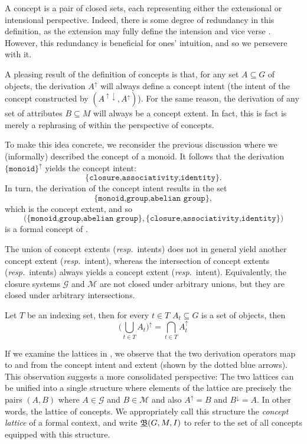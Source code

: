 A concept is a pair of closed sets, each representing either the extensional or intensional perspective. Indeed, there
is some degree of redundancy in this definition, as the extension may fully define the intension and vice verse \cite{ganter2016conceptual}.
However, this redundancy is beneficial for ones' intuition, and so we persevere with it.

A pleasing result of the definition of concepts is that, for any set $A \subseteq G$ of objects, the derivation $A^{\uparrow}$
will always define a concept intent (the intent of the concept constructed by $(A^{\uparrow \downarrow}, A^{\uparrow})$).
For the same reason, the derivation of any set of attributes $B \subseteq M$ will always be a concept extent. In fact, this
is fact is merely a rephrasing of  within the perspective of concepts.

To make this idea concrete, we reconsider the previous discussion where we (informally) described the concept of a
monoid. It follows that the derivation $\{\texttt{monoid}\}^{\uparrow}$ yields the concept intent:
\[
	\{\texttt{closure,associativity,identity}\}.
\]
%
In turn, the derivation of the concept intent results in the set
\[
	\{\texttt{monoid,group,abelian group}\},
\]which is the concept extent, and so
\[
	\big(\{\texttt{monoid,group,abelian group}\}, \{\texttt{closure,associativity,identity}\}\big)
\]
is a formal concept of .

The union of concept extents (\textit{resp.}\ intents) does not in general yield another concept extent (\textit{resp.}\ intent),
whereas the intersection of concept extents (\textit{resp.}\ intents) always yields a concept extent (\textit{resp.}\ intent).
Equivalently, the closure systems $\mathcal{G}$ and $\mathcal{M}$ are not closed under arbitrary unions, but they are closed
under arbitrary intersections.

\begin{proposition}
	\label{proposition:intersection-union-concepts} Let $T$ be an indexing set, then for every $t \in T$
	$A_{t}\subseteq G$ is a set of objects, then
	\[
		\big( \underset{t \in T}\bigcup A_{t}\big)^{\uparrow}= \underset{t \in T}\bigcap A_{t}^{\uparrow}
	\]
\end{proposition}

If we examine the lattices in , we observe that the two derivation operators map to and from the
concept intent and extent (shown by the dotted blue arrows). This observation suggests a more consolidated perspective: The
two lattices can be unified into a single structure where elements of the lattice are precisely the pairs $(A,B)$ where $A
\in \mathcal{G}$ and $B \in \mathcal{M}$ and also $A^{\uparrow}= B$ and $B^{\downarrow}= A$. In other words, the lattice
of concepts. We appropriately call this structure the \textit{concept lattice} of a formal context, and write $\underline{{\mathfrak B}} (G,M,\mathrel{I})$
to refer to the set of all concepts equipped with this structure.

